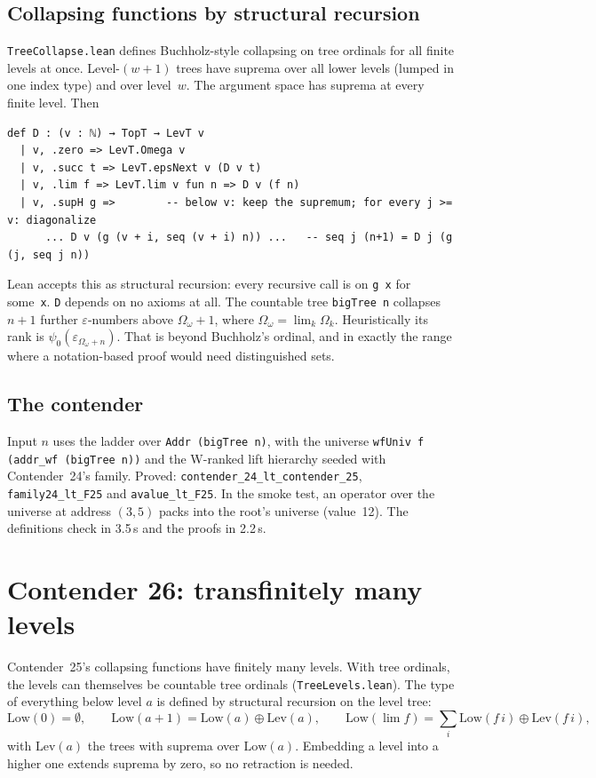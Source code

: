 \documentclass[11pt]{article}
\theoremstyle{definition}
\theoremstyle{remark}
\newcommand{\lean}[1]{\texttt{#1}}
\begin{document}
\subsection{Collapsing functions by structural recursion}
\lean{TreeCollapse.lean} defines Buchholz-style collapsing on tree ordinals for
all finite levels at once. Level-$(w{+}1)$ trees have suprema over all lower
levels (lumped in one index type) and over level~$w$. The argument space has
suprema at every finite level. Then
\begin{lstlisting}
def D : (v : ℕ) → TopT → LevT v
  | v, .zero => LevT.Omega v
  | v, .succ t => LevT.epsNext v (D v t)
  | v, .lim f => LevT.lim v fun n => D v (f n)
  | v, .supH g =>        -- below v: keep the supremum; for every j >= v: diagonalize
      ... D v (g (v + i, seq (v + i) n)) ...   -- seq j (n+1) = D j (g (j, seq j n))
\end{lstlisting}
Lean accepts this as structural recursion: every recursive call is on
\lean{g x} for some~\lean{x}. \lean{D} depends on no axioms at all.
The countable tree \lean{bigTree n} collapses $n{+}1$ further $\varepsilon$-numbers
above $\Omega_\omega+1$, where $\Omega_\omega=\lim_k\Omega_k$. Heuristically
its rank is $\psi_0(\varepsilon_{\Omega_\omega+n})$. That is beyond Buchholz's
ordinal, and in exactly the range where a notation-based proof would need
distinguished sets.

\subsection{The contender}
Input $n$ uses the ladder over \lean{Addr (bigTree n)}, with the universe
\lean{wfUniv f (addr\_wf (bigTree n))} and the W-ranked lift hierarchy seeded
with Contender~24's family. Proved:
\lean{contender\_24\_lt\_\allowbreak contender\_25}, \lean{family24\_lt\_F25} and
\lean{avalue\_lt\_F25}. In the smoke test, an operator over the universe at
address $(3,5)$ packs into the root's universe (value~12). The definitions check
in 3.5\,s and the proofs in 2.2\,s.

\section{Contender 26: transfinitely many levels}

Contender~25's collapsing functions have finitely many levels. With tree
ordinals, the levels can themselves be countable tree ordinals
(\lean{TreeLevels.lean}). The type of everything below level $a$ is defined by
structural recursion on the level tree:
\[
\mathrm{Low}(0)=\emptyset,\qquad
\mathrm{Low}(a{+}1)=\mathrm{Low}(a)\oplus\mathrm{Lev}(a),\qquad
\mathrm{Low}(\lim f)=\textstyle\sum_i \mathrm{Low}(f\,i)\oplus\mathrm{Lev}(f\,i),
\]
with $\mathrm{Lev}(a)$ the trees with suprema over $\mathrm{Low}(a)$. Embedding
a level into a higher one extends suprema by zero, so no retraction is needed.
\end{document}
